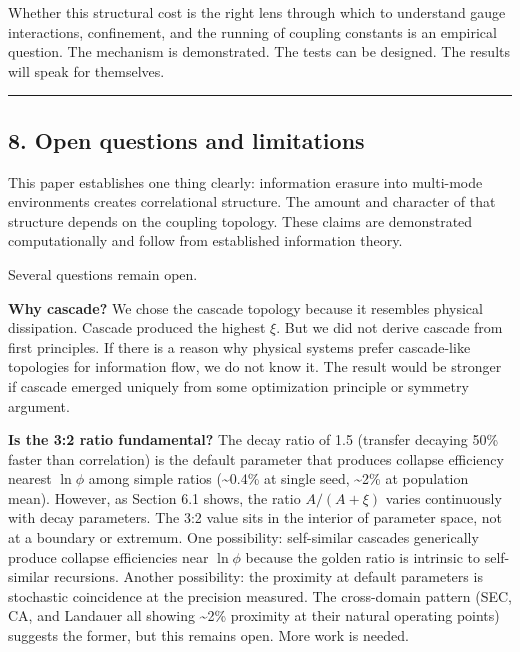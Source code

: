 \documentclass[
  11pt,
  a4paper]{article}
\begin{document}
Whether this structural cost is the right lens through which to
understand gauge interactions, confinement, and the running of coupling
constants is an empirical question. The mechanism is demonstrated. The
tests can be designed. The results will speak for themselves.

\begin{center}\rule{0.5\linewidth}{0.5pt}\end{center}

\subsection{8. Open questions and
limitations}\label{open-questions-and-limitations}

This paper establishes one thing clearly: information erasure into
multi-mode environments creates correlational structure. The amount and
character of that structure depends on the coupling topology. These
claims are demonstrated computationally and follow from established
information theory.

Several questions remain open.

\textbf{Why cascade?} We chose the cascade topology because it resembles
physical dissipation. Cascade produced the highest \(\xi\). But we did
not derive cascade from first principles. If there is a reason why
physical systems prefer cascade-like topologies for information flow, we
do not know it. The result would be stronger if cascade emerged uniquely
from some optimization principle or symmetry argument.

\textbf{Is the 3:2 ratio fundamental?} The decay ratio of 1.5 (transfer
decaying 50\% faster than correlation) is the default parameter that
produces collapse efficiency nearest \(\ln\phi\) among simple ratios
(\textasciitilde0.4\% at single seed, \textasciitilde2\% at population
mean). However, as Section 6.1 shows, the ratio \(A/(A+\xi)\) varies
continuously with decay parameters. The 3:2 value sits in the interior
of parameter space, not at a boundary or extremum. One possibility:
self-similar cascades generically produce collapse efficiencies near
\(\ln\phi\) because the golden ratio is intrinsic to self-similar
recursions. Another possibility: the proximity at default parameters is
stochastic coincidence at the precision measured. The cross-domain
pattern (SEC, CA, and Landauer all showing \textasciitilde2\% proximity
at their natural operating points) suggests the former, but this remains
open. More work is needed.
\end{document}
